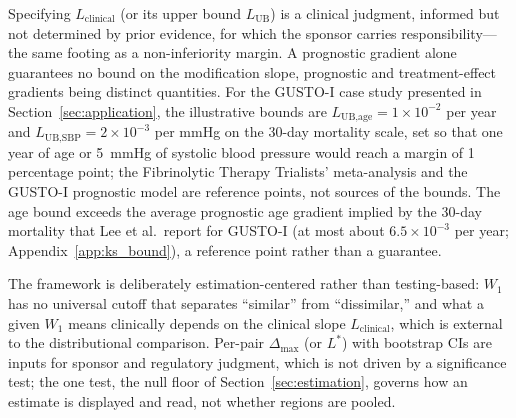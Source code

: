 \documentclass[AMA,Times1COL]{WileyNJDv5}
\begin{document}
Specifying $L_{\text{clinical}}$ (or its upper bound $L_{\text{UB}}$) is a clinical judgment, informed but not determined by prior evidence, for which the sponsor carries responsibility---the same footing as a non-inferiority margin. A prognostic gradient alone guarantees no bound on the modification slope, prognostic and treatment-effect gradients being distinct quantities.\cite{ballman2015,kent2020} For the GUSTO-I case study presented in Section~\ref{sec:application}, the illustrative bounds are $L_{\text{UB,age}} = 1 \times 10^{-2}$ per year and $L_{\text{UB,SBP}} = 2 \times 10^{-3}$ per mmHg on the 30-day mortality scale, set so that one year of age or 5~mmHg of systolic blood pressure would reach a margin of 1 percentage point; the Fibrinolytic Therapy Trialists' meta-analysis\cite{ftt1994} and the GUSTO-I prognostic model\cite{lee1995} are reference points, not sources of the bounds. The age bound exceeds the average prognostic age gradient implied by the 30-day mortality that Lee et al.\ report for GUSTO-I (at most about $6.5 \times 10^{-3}$ per year; Appendix~\ref{app:ks_bound}),\cite{lee1995} a reference point rather than a guarantee.

The framework is deliberately estimation-centered rather than testing-based: $W_1$ has no universal cutoff that separates ``similar'' from ``dissimilar,'' and what a given $W_1$ means clinically depends on the clinical slope $L_{\text{clinical}}$, which is external to the distributional comparison. Per-pair $\Delta_{\max}$ (or $L^*$) with bootstrap CIs are inputs for sponsor and regulatory judgment, which is not driven by a significance test;\cite{wasserstein2016} the one test, the null floor of Section~\ref{sec:estimation}, governs how an estimate is displayed and read, not whether regions are pooled.
\end{document}
